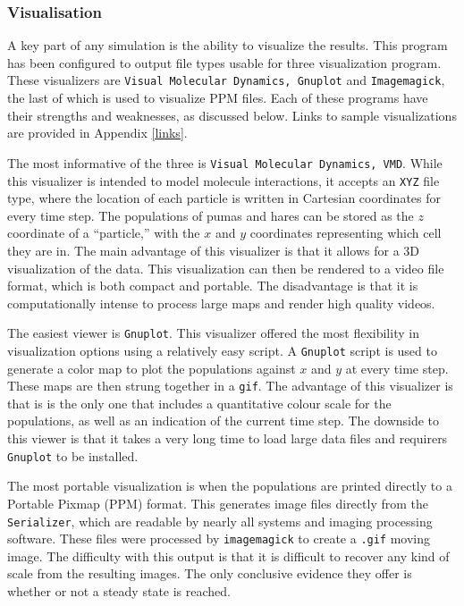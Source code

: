 \documentclass[a4paper,11pt]{article}
\begin{document}
\subsubsection{Visualisation}\label{visual}

A key part of any simulation is the ability to visualize the results.  This program has been configured to output file types usable for three visualization program.  These visualizers are \texttt{Visual Molecular Dynamics, Gnuplot} and \texttt{Imagemagick}, the last of which is used to visualize PPM files.  Each of these programs have their strengths and weaknesses, as discussed below.  Links to sample visualizations are provided in Appendix \ref{links}.

The most informative of the three is \texttt{Visual Molecular Dynamics, VMD}.  While this visualizer is intended to model molecule interactions, it accepts an \texttt{XYZ} file type, where the location of each particle is written in Cartesian coordinates for every time step.  The populations of pumas and hares can be stored as the $z$ coordinate of a ``particle,'' with the $x$ and $y$ coordinates representing which cell they are in.  The main advantage of this visualizer is that it allows for a 3D visualization of the data.  This visualization can then be rendered to a video file format, which is both compact and portable.  The disadvantage is that it is computationally intense to process large maps and render high quality videos.  

The easiest viewer is \texttt{Gnuplot}.  This visualizer offered the most flexibility in visualization options using a relatively easy script.  A \texttt{Gnuplot} script is used to generate a color map to plot the populations against $x$ and $y$ at every time step.  These maps are then strung together in a \texttt{gif}.  The advantage of this visualizer is that is is the only one that includes a quantitative colour scale for the populations, as well as an indication of the current time step.  The downside to this viewer is that it takes a very long time to load large data files and requirers \texttt{Gnuplot} to be installed.

The most portable visualization is when the populations are printed directly to a Portable Pixmap (PPM) format.  This generates image files directly from the \texttt{Serializer}, which are readable by nearly all systems and imaging processing software.  These files were processed by \texttt{imagemagick} to create a \texttt{.gif} moving image.  The difficulty with this output is that it is difficult to recover any kind of scale from the resulting images.  The only conclusive evidence they offer is whether or not a steady state is reached.  
\end{document}
